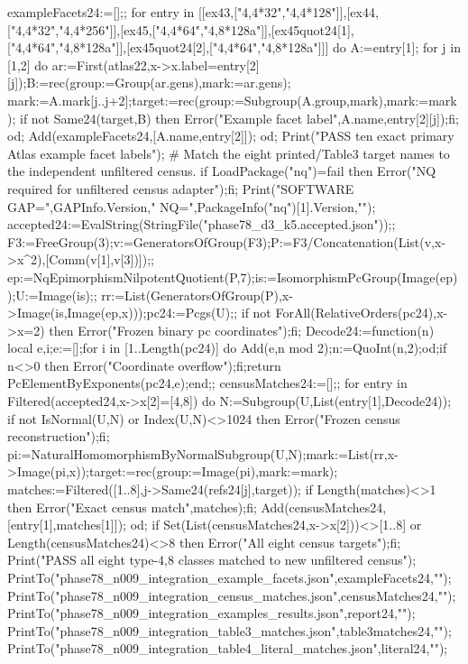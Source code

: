 \documentclass[11pt,a4paper]{article}
\begin{document}
\begin{CompleteProgram}
exampleFacets24:=[];;
for entry in [[ex43,["{4,4}*32","{4,4}*128"]],[ex44,["{4,4}*32","{4,4}*256"]],[ex45,["{4,4}*64","{4,8}*128a"]],[ex45quot24[1],["{4,4}*64","{4,8}*128a"]],[ex45quot24[2],["{4,4}*64","{4,8}*128a"]]] do
 A:=entry[1];
 for j in [1,2] do
  ar:=First(atlas22,x->x.label=entry[2][j]);B:=rec(group:=Group(ar.gens),mark:=ar.gens);
  mark:=A.mark{[j..j+2]};target:=rec(group:=Subgroup(A.group,mark),mark:=mark);
  if not Same24(target,B) then Error("Example facet label",A.name,entry[2][j]);fi;
 od;
 Add(exampleFacets24,[A.name,entry[2]]);
od;
Print("PASS ten exact primary Atlas example facet labels\n");
# Match the eight printed/Table3 target names to the independent unfiltered census.
if LoadPackage("nq")=fail then Error("NQ required for unfiltered census adapter");fi;
Print("SOFTWARE GAP=",GAPInfo.Version," NQ=",PackageInfo("nq")[1].Version,"\n");
accepted24:=EvalString(StringFile("phase78_d3_k5.accepted.json"));;
F3:=FreeGroup(3);v:=GeneratorsOfGroup(F3);P:=F3/Concatenation(List(v,x->x^2),[Comm(v[1],v[3])]);;
ep:=NqEpimorphismNilpotentQuotient(P,7);is:=IsomorphismPcGroup(Image(ep));U:=Image(is);;
rr:=List(GeneratorsOfGroup(P),x->Image(is,Image(ep,x)));pc24:=Pcgs(U);;
if not ForAll(RelativeOrders(pc24),x->x=2) then Error("Frozen binary pc coordinates");fi;
Decode24:=function(n) local e,i;e:=[];for i in [1..Length(pc24)] do Add(e,n mod 2);n:=QuoInt(n,2);od;if n<>0 then Error("Coordinate overflow");fi;return PcElementByExponents(pc24,e);end;;
censusMatches24:=[];;
for entry in Filtered(accepted24,x->x[2]=[4,8]) do
 N:=Subgroup(U,List(entry[1],Decode24));
 if not IsNormal(U,N) or Index(U,N)<>1024 then Error("Frozen census reconstruction");fi;
 pi:=NaturalHomomorphismByNormalSubgroup(U,N);mark:=List(rr,x->Image(pi,x));target:=rec(group:=Image(pi),mark:=mark);
 matches:=Filtered([1..8],j->Same24(refs24[j],target));
 if Length(matches)<>1 then Error("Exact census match",matches);fi;
 Add(censusMatches24,[entry[1],matches[1]]);
od;
if Set(List(censusMatches24,x->x[2]))<>[1..8] or Length(censusMatches24)<>8 then Error("All eight census targets");fi;
Print("PASS all eight type-{4,8} classes matched to new unfiltered census\n");
PrintTo("phase78_n009_integration_example_facets.json",exampleFacets24,"\n");
PrintTo("phase78_n009_integration_census_matches.json",censusMatches24,"\n");
PrintTo("phase78_n009_integration_examples_results.json",report24,"\n");
PrintTo("phase78_n009_integration_table3_matches.json",table3matches24,"\n");
PrintTo("phase78_n009_integration_table4_literal_matches.json",literal24,"\n");


\end{CompleteProgram}
\end{document}
